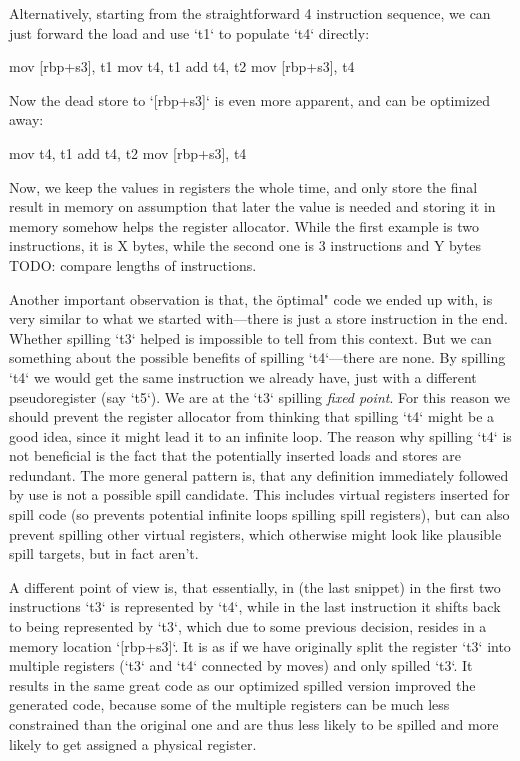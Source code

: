 Alternatively, starting from the straightforward 4 instruction sequence, we can
just forward the load and use `t1` to populate `t4` directly:

\begtt
mov [rbp+s3], t1
mov t4, t1
add t4, t2
mov [rbp+s3], t4
\endtt

Now the dead store to `[rbp+s3]` is even more apparent, and can be optimized
away:

\begtt
mov t4, t1
add t4, t2
mov [rbp+s3], t4
\endtt

Now, we keep the values in registers the whole time, and only store the final
result in memory on assumption that later the value is needed and storing it in
memory somehow helps the register allocator. While the first example is two
instructions, it is X bytes, while the second one is 3 instructions and Y bytes
TODO: compare lengths of instructions.

Another important observation is that, the \"optimal" code we ended up with, is
very similar to what we started with---there is just a store instruction in the
end. Whether spilling `t3` helped is impossible to tell from this context. But
we can something about the possible benefits of spilling `t4`---there are none.
By spilling `t4` we would get the same instruction we already have, just with a
different pseudoregister (say `t5`). We are at the `t3` spilling {\em fixed
point}. For this reason we should prevent the register allocator from thinking
that spilling `t4` might be a good idea, since it might lead it to an infinite
loop. The reason why spilling `t4` is not beneficial is the fact that the potentially
inserted loads and stores are redundant. The more general pattern is, that any
definition immediately followed by use is not a possible spill candidate. This includes
virtual registers inserted for spill code (so prevents potential infinite loops
spilling spill registers), but can also prevent spilling other virtual
registers, which otherwise might look like plausible spill targets, but in fact
aren't.

A different point of view is, that essentially, in (the last snippet)
in the first two instructions `t3` is represented by `t4`, while in the last
instruction it shifts back to being represented by `t3`, which due to some
previous decision, resides in a memory location `[rbp+s3]`. It is as if we have
originally split the register `t3` into multiple registers (`t3` and `t4`
connected by moves) and only spilled `t3`. It results in the same great code as
our optimized spilled version improved the generated code, because some of the
multiple registers can be much less constrained than the original one and are
thus less likely to be spilled and more likely to get assigned a physical
register.

